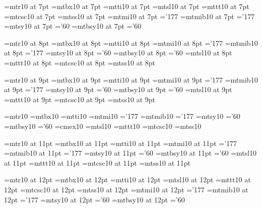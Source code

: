 \font\sevenrm=mtr10 at 7pt
\font\sevenbf=mtbx10 at 7pt
\font\sevenit=mtti10 at 7pt
\font\sevensl=mtsl10 at 7pt
\font\seventt=mttt10 at 7pt     \hyphenchar{}
\font\sevencsc=mtcsc10 at 7pt
\font\sevensf=mtss10 at 7pt
\font\seveni=mtmi10 at 7pt      \skewchar\seveni='177
\font\sevenmib=mtmib10 at 7pt   \skewchar\sevenmib='177
\font\sevensy=mtsy10 at 7pt     \skewchar\sevensy='60
\font\sevensyb=mtbsy10 at 7pt   \skewchar\sevensyb='60

\font\eightrm=mtr10 at 8pt
\font\eightbf=mtbx10 at 8pt
\font\eightit=mtti10 at 8pt
\font\eighti=mtmi10 at 8pt      \skewchar\eighti='177
\font\eightmib=mtmib10 at 8pt   \skewchar\eightmib='177
\font\eightsy=mtsy10 at 8pt     \skewchar\eightsy='60
\font\eightsyb=mtbsy10 at 8pt   \skewchar\eightsyb='60
\font\eightsl=mtsl10 at 8pt
\font\eighttt=mttt10 at 8pt     \hyphenchar{}
\font\eightcsc=mtcsc10 at 8pt
\font\eightsf=mtss10 at 8pt

\font\ninerm=mtr10 at 9pt
\font\ninebf=mtbx10 at 9pt
\font\nineit=mtti10 at 9pt
\font\ninei=mtmi10 at 9pt      \skewchar\ninei='177
\font\ninemib=mtmib10 at 9pt   \skewchar\ninemib='177
\font\ninesy=mtsy10 at 9pt     \skewchar\ninesy='60
\font\ninesyb=mtbsy10 at 9pt   \skewchar\ninesyb='60
\font\ninesl=mtsl10 at 9pt
\font\ninett=mttt10 at 9pt     \hyphenchar{}
\font\ninecsc=mtcsc10 at 9pt
\font\ninesf=mtss10 at 9pt

\font\tenrm=mtr10
\font\tenbf=mtbx10
\font\tenit=mtti10
\font\teni=mtmi10		\skewchar\teni='177
\font\tenmib=mtmib10	\skewchar\tenmib='177
\font\tensy=mtsy10		\skewchar\tensy='60
\font\tensyb=mtbsy10	\skewchar\tensyb='60
\font\tenex=cmex10
\font\tensl=mtsl10
\font\tentt=mttt10		\hyphenchar{}
\font\tencsc=mtcsc10
\font\tensf=mtss10

\font\elevenrm=mtr10 at 11pt
\font\elevenbf=mtbx10 at 11pt
\font\elevenit=mtti10 at 11pt
\font\eleveni=mtmi10 at 11pt      \skewchar\eleveni='177
\font\elevenmib=mtmib10 at 11pt   \skewchar\elevenmib='177
\font\elevensy=mtsy10 at 11pt     \skewchar\elevensy='60
\font\elevensyb=mtbsy10 at 11pt   \skewchar\elevensyb='60
\font\elevensl=mtsl10 at 11pt
\font\eleventt=mttt10 at 11pt     \hyphenchar{}
\font\elevencsc=mtcsc10 at 11pt
\font\elevensf=mtss10 at 11pt

\font\twelverm=mtr10 at 12pt
\font\twelvebf=mtbx10 at 12pt
\font\twelveit=mtti10 at 12pt
\font\twelvesl=mtsl10 at 12pt
\font\twelvett=mttt10 at 12pt     \hyphenchar{}
\font\twelvecsc=mtcsc10 at 12pt
\font\twelvesf=mtss10 at 12pt
\font\twelvei=mtmi10 at 12pt      \skewchar\twelvei='177
\font\twelvemib=mtmib10 at 12pt   \skewchar\twelvemib='177
\font\twelvesy=mtsy10 at 12pt     \skewchar\twelvesy='60
\font\twelvesyb=mtbsy10 at 12pt   \skewchar\twelvesyb='60

